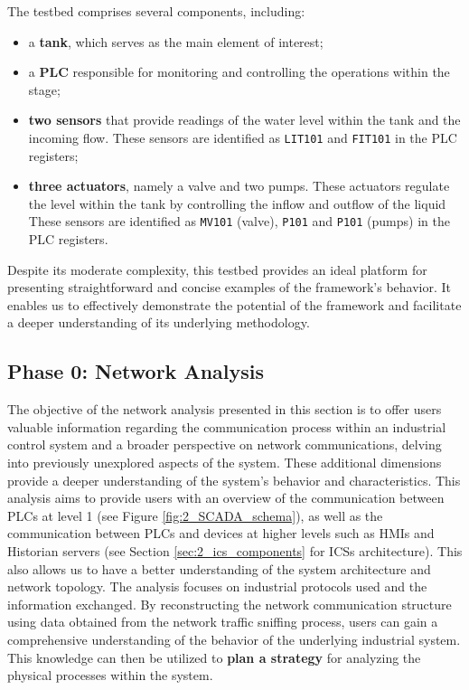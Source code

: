 \bigskip
The testbed comprises several components, including:

\begin{itemize}
	\item a \textbf{tank}, which serves as the main element of interest;
	
	\item a \textbf{PLC} responsible for monitoring and controlling the operations within the stage;
	
	\item \textbf{two sensors} that provide readings of the water level within the tank and the incoming flow. These sensors are identified as \texttt{LIT101} and \texttt{FIT101} in the PLC registers;
	
	\item \textbf{three actuators}, namely a valve and two pumps. These actuators regulate the level within the tank by controlling the inflow and outflow of the liquid These sensors are identified as \texttt{MV101} (valve), \texttt{P101} and \texttt{P101} (pumps) in the PLC registers.
\end{itemize}

Despite its moderate complexity, this testbed provides an ideal platform for presenting straightforward and concise examples of the framework's behavior. It enables us to effectively demonstrate the potential of the framework and facilitate a deeper understanding of its underlying methodology.

\subsection{Phase 0: Network Analysis}
\label{subsec:4_network_analysis}
The objective of the network analysis presented in this section is to offer users valuable information regarding the communication process within an industrial control system and a broader perspective on network communications, delving into previously unexplored aspects of the system. These additional dimensions provide a deeper understanding of the system's behavior and characteristics. This analysis aims to provide users with an overview of the communication between PLCs at level 1 (see Figure \ref{fig:2_SCADA_schema}), as well as the communication between PLCs and devices at higher levels such as HMIs and Historian servers (see Section \ref{sec:2_ics_components} for ICSs architecture). This also allows us to have a better understanding of the system architecture and network topology. The analysis focuses on industrial protocols used and the information exchanged.\newline
By reconstructing the network communication structure using data obtained from the network traffic sniffing process, users can gain a comprehensive understanding of the behavior of the underlying industrial system. This knowledge can then be utilized to \textbf{plan a strategy} for analyzing the physical processes within the system.

